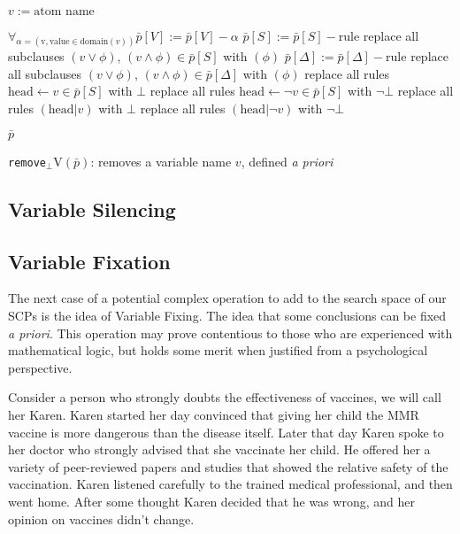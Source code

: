 \begin{algorithm}[H] \label{cogOp:removeuV}
\SetAlgoLined
{}
$v:= \text{atom name}$\;
{
$\forall_{\alpha = (\text{v},\text{value}\in \text{domain}(v))} \bar{p}[V]:=\bar{p}[V] - \alpha$\;
{
{
$\bar{p}[S]:=\bar{p}[S]-\text{rule}$\;
}
{
replace all subclauses $(v \lor \phi)$, $(v \land \phi)\in \bar{p}[S]$ with $(\phi)$\;
}
}
{
{
$\bar{p}[\Delta]:=\bar{p}[\Delta] - \text{rule}$\;
}
{
replace all subclauses $(v \lor \phi)$, $(v \land \phi)\in \bar{p}[\Delta]$ with $(\phi)$\;
}
}
replace all rules $\text{head} \leftarrow v \in \bar{p}[S]$ with $\bot$\;
replace all rules $\text{head} \leftarrow \lnot v \in \bar{p}[S]$ with $\lnot \bot$\;
replace all rules $(\text{head}|v)$ with $\bot$\;
replace all rules $(\text{head}|\lnot v)$ with $\lnot \bot$\;

\Return $\bar{p}$
}

\caption{\texttt{remove}$_\bot$V$(\bar{p})$: removes a variable name $v$, defined \textit{a priori}}
\end{algorithm}

\subsection{Variable Silencing}
\subsection{Variable Fixation} \label{ssec:variableFixing}
The next case of a potential complex operation to add to the search space of our SCPs is the idea of Variable Fixing. The idea that some  conclusions can be fixed \textit{a priori}. This operation may prove contentious to those who are experienced with mathematical logic, but holds some merit when justified from a psychological perspective. 

Consider a person who strongly doubts the effectiveness of vaccines, we will call her Karen. Karen started her day convinced that giving her child the MMR vaccine is more dangerous than the disease itself. Later that day Karen spoke to her doctor who strongly advised that she vaccinate her child. He offered her a variety of peer-reviewed papers and studies that showed the relative safety of the vaccination. Karen listened carefully to the trained medical professional, and then went home. After some thought Karen decided that he was wrong, and her opinion on vaccines didn't change.

